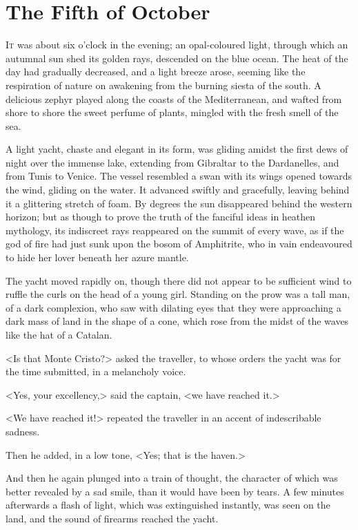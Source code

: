 \chapter{The Fifth of October} 

 \lettrine{I}{t} was about six o'clock in the evening; an opal-coloured light, through which an autumnal sun shed its golden rays, descended on the blue ocean. The heat of the day had gradually decreased, and a light breeze arose, seeming like the respiration of nature on awakening from the burning siesta of the south. A delicious zephyr played along the coasts of the Mediterranean, and wafted from shore to shore the sweet perfume of plants, mingled with the fresh smell of the sea. 

 A light yacht, chaste and elegant in its form, was gliding amidst the first dews of night over the immense lake, extending from Gibraltar to the Dardanelles, and from Tunis to Venice. The vessel resembled a swan with its wings opened towards the wind, gliding on the water. It advanced swiftly and gracefully, leaving behind it a glittering stretch of foam. By degrees the sun disappeared behind the western horizon; but as though to prove the truth of the fanciful ideas in heathen mythology, its indiscreet rays reappeared on the summit of every wave, as if the god of fire had just sunk upon the bosom of Amphitrite, who in vain endeavoured to hide her lover beneath her azure mantle. 

 The yacht moved rapidly on, though there did not appear to be sufficient wind to ruffle the curls on the head of a young girl. Standing on the prow was a tall man, of a dark complexion, who saw with dilating eyes that they were approaching a dark mass of land in the shape of a cone, which rose from the midst of the waves like the hat of a Catalan. 

 <Is that Monte Cristo?> asked the traveller, to whose orders the yacht was for the time submitted, in a melancholy voice. 

 <Yes, your excellency,> said the captain, <we have reached it.> 

 <We have reached it!> repeated the traveller in an accent of indescribable sadness. 

 Then he added, in a low tone, <Yes; that is the haven.> 

 And then he again plunged into a train of thought, the character of which was better revealed by a sad smile, than it would have been by tears. A few minutes afterwards a flash of light, which was extinguished instantly, was seen on the land, and the sound of firearms reached the yacht. 


